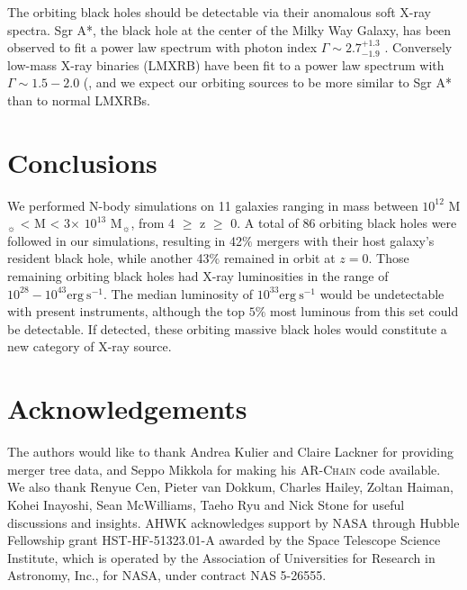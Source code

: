 \documentclass[fleqn,usenatbib,useAMS]{mnras}
\begin{document}
The orbiting black holes should be detectable via their anomalous soft X-ray spectra. Sgr A*, the black hole at the center of the Milky Way Galaxy, has been observed to fit a power law spectrum with photon index $\Gamma\sim2.7^{+1.3}_{-1.9}$ \citet{2003ApJ...591..891B}.  Conversely low-mass X-ray binaries (LMXRB) have been fit to a power law spectrum with $\Gamma\sim1.5-2.0$ (\citet{2018Natur.556...70H}, and we expect our orbiting sources to be more similar to Sgr A* than to normal LMXRBs.

\section{Conclusions}\label{sec:conclusions}
We performed N-body simulations on 11 galaxies ranging in mass between $10^{12}$ M$_{\sun}$ < M < 3$\times$ $10^{13}$ M$_{\sun}$, from 4 $\geq$ z $\geq$ 0.  A total of 86 orbiting black holes were followed in our simulations, resulting in 42$\%$ mergers with their host galaxy's resident black hole, while another 43$\%$ remained in orbit at $z=0$.  Those remaining orbiting black holes had X-ray luminosities in the range of $10^{28}-10^{43}\mathrm{erg}~\mathrm{s}^{-1}$.  The median luminosity of $10^{33}\mathrm{erg}~\mathrm{s}^{-1}$ would be undetectable with present instruments, although the top $5\%$ most luminous from this set could be detectable.  If detected, these orbiting massive black holes would constitute a new category of X-ray source.

\section{Acknowledgements}
The authors would like to thank Andrea Kulier and Claire Lackner for providing merger tree data, and Seppo Mikkola for making his \textsc{AR-Chain} code available. We also thank Renyue Cen, Pieter van Dokkum, Charles Hailey, Zoltan Haiman, Kohei Inayoshi, Sean McWilliams, Taeho Ryu and Nick Stone for useful discussions and insights.  AHWK acknowledges support by NASA through Hubble Fellowship grant HST-HF-51323.01-A awarded by the Space Telescope Science Institute, which is operated by the Association of Universities for Research in Astronomy, Inc., for NASA, under contract NAS 5-26555.








\bsp	%
\label{lastpage}
\end{document}
